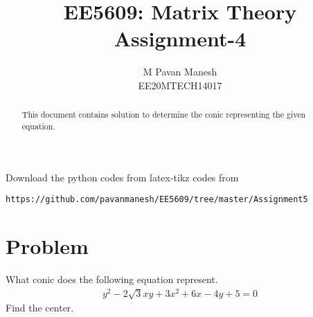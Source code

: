 \documentclass[journal,12pt,twocolumn]{IEEEtran}
\begin{document}
\makeatother
\let\StandardTheFigure\thefigure
\let\vec\mathbf
\renewcommand{\thefigure}{\theproblem}
\def\putbox#1#2#3{\makebox[0in][l]{\makebox[#1][l]{}\raisebox{\baselineskip}[0in][0in]{\raisebox{#2}[0in][0in]{#3}}}}
     \def\rightbox#1{\makebox[0in][r]{#1}}
     \def\centbox#1{\makebox[0in]{#1}}
     \def\topbox#1{\raisebox{-\baselineskip}[0in][0in]{#1}}
     \def\midbox#1{\raisebox{-0.5\baselineskip}[0in][0in]{#1}}
\vspace{3cm}
\title{EE5609: Matrix Theory\\
          Assignment-4\\}
\author{M Pavan Manesh\\
EE20MTECH14017 }
\maketitle
\newpage
\bigskip
\renewcommand{\thefigure}{\theenumi}
\renewcommand{\thetable}{\theenumi}
\begin{abstract}
This document contains solution to determine the conic representing the given equation. 
\end{abstract}
Download the python codes from 
%
%
latex-tikz codes from 
%
\begin{lstlisting}
https://github.com/pavanmanesh/EE5609/tree/master/Assignment5
\end{lstlisting}
%
\section{Problem}
What conic does the following equation represent. 
\begin{align*}
y^2-2\sqrt{3}xy+3x^2+6x-4y+5 = 0
\end{align*}
Find the center.
\end{document}

